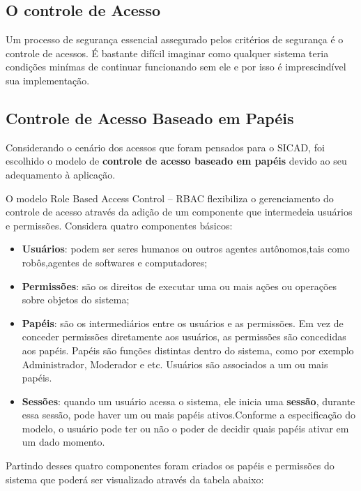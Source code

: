 \documentclass[12pt, a4paper]{report}
\begin{document}
\subsection{O controle de Acesso}
\par Um processo de segurança essencial assegurado pelos critérios de segurança é o controle de acessos. É bastante difícil imaginar como qualquer sistema teria condições minímas de continuar funcionando sem ele e por isso é imprescindível sua implementação.
\subsection{Controle  de  Acesso  Baseado  em  Papéis }
\par Considerando o cenário dos acessos que foram pensados para o SICAD, foi escolhido o  modelo  de   \textbf{controle  de  acesso  baseado  em  papéis} devido ao seu adequamento à aplicação.
\par O modelo Role Based Access Control – RBAC flexibiliza o gerenciamento do controle de acesso através da adição de um componente que intermedeia usuários e permissões\cite{sandhu1997}. Considera quatro componentes básicos:
\begin{itemize}
\item \textbf{Usuários}: podem ser seres humanos ou outros agentes autônomos,tais como robôs,agentes de softwares e computadores;
\item \textbf{Permissões}: são os direitos de executar uma ou mais ações ou operações sobre objetos do sistema;
\item \textbf{Papéis}: são os intermediários entre os usuários e as permissões. Em vez de conceder permissões diretamente aos usuários, as permissões são concedidas aos papéis. Papéis são funções distintas dentro do sistema, como por exemplo Administrador, Moderador e etc. Usuários são associados a um ou mais papéis.  
\item \textbf{Sessões}: quando um usuário acessa o sistema, ele inicia uma \textbf{sessão}, durante  essa  sessão, pode haver  um  ou  mais  papéis ativos.Conforme a especificação do modelo, o usuário pode ter ou não o poder de decidir quais papéis ativar em um dado momento.
\end{itemize}
\par Partindo desses quatro componentes foram criados os papéis e permissões do sistema que poderá ser visualizado através da tabela abaixo:
\end{document}
